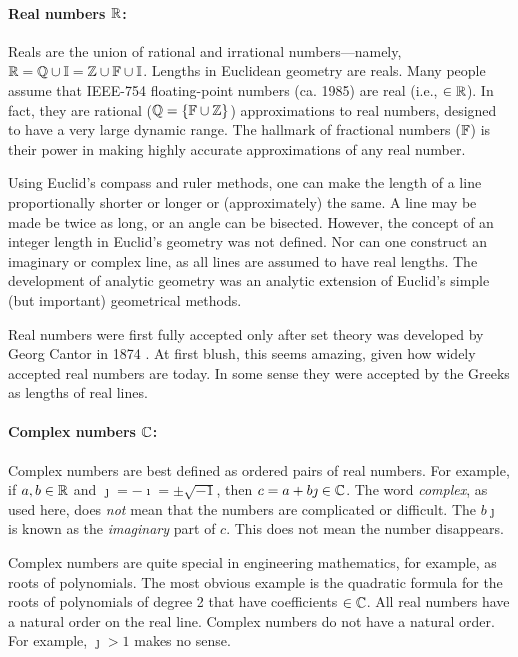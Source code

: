 \documentclass{ximera}
\begin{document}
\paragraph{Real numbers $\mathbb{R}$: \label{page:bbR} }
Reals are the union of rational and irrational numbers---namely, $\mathbb{R} = \mathbb{Q} \cup \mathbb{I}  = \mathbb{Z} \cup \mathbb{F} \cup \mathbb{I}$.
Lengths in Euclidean geometry are reals.  Many people assume that IEEE-754 floating-point numbers
(ca. 1985) are real (i.e., $\in\mathbb{R}$). In fact, they are rational ($\mathbb{Q} = \{\mathbb{F} \cup \mathbb{Z} \}$) approximations to
real numbers, designed to have a very large dynamic range.
The hallmark of fractional numbers ($\mathbb{F}$) is their power in making highly accurate approximations
of any real number.

Using Euclid's compass and ruler methods, one can make the length of a line proportionally shorter or longer or
(approximately) the same.  A line may be made be twice as long, or an angle can be bisected. However,
the concept of an integer length in Euclid's geometry was not defined.%
Nor can one construct an imaginary or complex line, as all lines are assumed to have real lengths.
The development of analytic geometry was an analytic extension of Euclid's simple (but important)
geometrical methods.

  
Real numbers were first fully accepted only after set theory was developed by Georg Cantor in 1874
\citep[p.~461]{JS10}. At first blush, this seems amazing, given how widely accepted real numbers are
today.  In some sense they were accepted by the Greeks as lengths of real lines.

\paragraph{Complex numbers $\mathbb{C}$: \label{page:bbC} }
Complex numbers are best defined as ordered pairs of real numbers.%
For example, if $a,b \in \mathbb{R}$ and $\jmath=-\imath=\pm\sqrt{-1}$, then $c=a+b\jmath \in\mathbb{C}$.
The word \emph{complex}, as used here, does \emph{not} mean that the numbers are complicated or difficult. 
The $b\jmath$ is known as the \emph{imaginary} part of $c$. This does not mean the number disappears. 

Complex numbers are quite special in engineering mathematics, for example, as roots of polynomials.
The most obvious example is the quadratic formula for the roots of polynomials of degree 2 that have coefficients $\in\mathbb{C}$.
All real numbers have a natural order on the real line. Complex numbers do not have a natural order.
For example, $\jmath > 1$ makes no sense.
\end{document}
